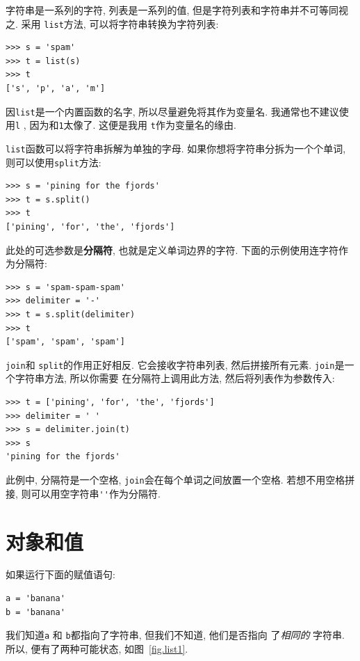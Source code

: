 \documentclass[10pt]{book}
\begin{document}
字符串是一系列的字符, 列表是一系列的值, 但是字符列表和字符串并不可等同视之. 
采用 {\tt list}方法, 可以将字符串转换为字符列表:

\begin{verbatim}
>>> s = 'spam'
>>> t = list(s)
>>> t
['s', 'p', 'a', 'm']
\end{verbatim}
%
因{\tt list}是一个内置函数的名字, 所以尽量避免将其作为变量名. 
我通常也不建议使用{\tt l} , 因为和{\tt 1}太像了. 这便是我用
{\tt t}作为变量名的缘由. 

{\tt list}函数可以将字符串拆解为单独的字母. 
如果你想将字符串分拆为一个个单词, 则可以使用{\tt split}方法:

\begin{verbatim}
>>> s = 'pining for the fjords'
>>> t = s.split()
>>> t
['pining', 'for', 'the', 'fjords']
\end{verbatim}
%
此处的可选参数是{\bf 分隔符}, 也就是定义单词边界的字符. 
下面的示例使用连字符作为分隔符:

\begin{verbatim}
>>> s = 'spam-spam-spam'
>>> delimiter = '-'
>>> t = s.split(delimiter)
>>> t
['spam', 'spam', 'spam']
\end{verbatim}
%
{\tt join}和 {\tt split}的作用正好相反. 
它会接收字符串列表, 然后拼接所有元素. 
{\tt join}是一个字符串方法, 所以你需要
在分隔符上调用此方法, 然后将列表作为参数传入:

\begin{verbatim}
>>> t = ['pining', 'for', 'the', 'fjords']
>>> delimiter = ' '
>>> s = delimiter.join(t)
>>> s
'pining for the fjords'
\end{verbatim}
%
此例中, 分隔符是一个空格, 
{\tt join}会在每个单词之间放置一个空格. 
若想不用空格拼接, 则可以用空字符串\verb"''"作为分隔符. 


\section{对象和值}
\label{equivalence}

如果运行下面的赋值语句:

\begin{verbatim}
a = 'banana'
b = 'banana'
\end{verbatim}
%
我们知道{\tt a} 和 {\tt b}都指向了字符串, 但我们不知道, 他们是否指向
了{\em 相同的} 字符串. 
所以, 便有了两种可能状态, 如图~\ref{fig.list1}.
\end{document}
